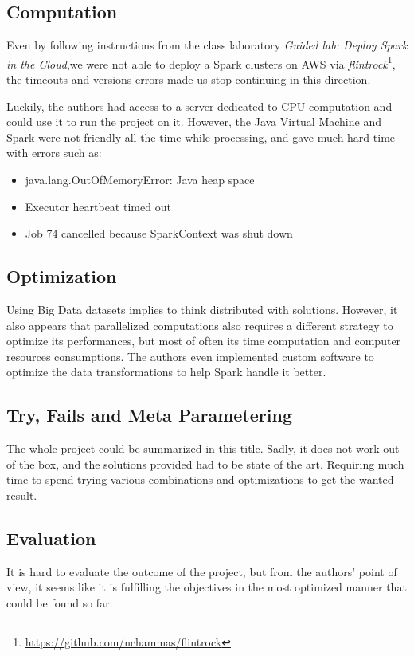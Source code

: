 \documentclass[a4paper]{article}
\begin{document}
\subsection{Computation}
Even by following instructions from the class laboratory \textit{Guided lab: Deploy Spark in the Cloud},we were not able to deploy a Spark clusters on AWS via \textit{flintrock}\footnote{\url{https://github.com/nchammas/flintrock}}, the timeouts and versions errors made us stop continuing in this direction.

Luckily, the authors had access to a server dedicated to CPU computation and could use it to run the project on it. However, the Java Virtual Machine and Spark were not friendly all the time while processing, and gave much hard time with errors such as:

\begin{itemize}
    \item java.lang.OutOfMemoryError: Java heap space
    \item Executor heartbeat timed out
    \item Job 74 cancelled because SparkContext was shut down
\end{itemize}

\subsection{Optimization}
Using Big Data datasets implies to think distributed with solutions. However, it also appears that parallelized computations also requires a different strategy to optimize its performances, but most of often its time computation and computer resources consumptions. The authors even implemented custom software to optimize the data transformations to help Spark handle it better.

\subsection{Try, Fails and Meta Parametering}
The whole project could be summarized in this title. Sadly, it does not work out of the box, and the solutions provided had to be state of the art. Requiring much time to spend trying various combinations and optimizations to get the wanted result.

\subsection{Evaluation}
It is hard to evaluate the outcome of the project, but from the authors' point of view, it seems like it is fulfilling the objectives in the most optimized manner that could be found so far.
\end{document}
